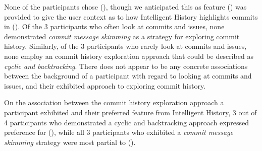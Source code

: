 None of the participants chose (), though we anticipated this as feature () was provided to give the user context as to how Intelligent History highlights commits in ().
Of the 3 participants who often look at commits and issues, none demonstrated \textit{commit message skimming} as a strategy for exploring commit history.
Similarly, of the 3 participants who rarely look at commits and issues, none employ an commit history exploration approach that could be described as \textit{cyclic and backtracking}.
There does not appear to be any concrete associations between the background of a participant with regard to looking at commits and issues,
and their exhibited approach to exploring commit history.

On the association between the commit history exploration approach a participant exhibited and their preferred feature from Intelligent History,
3 out of 4 participants who demonstrated a cyclic and backtracking approach expressed preference for (),
while all 3 participants who exhibited a \textit{commit message skimming} strategy were most partial to ().

